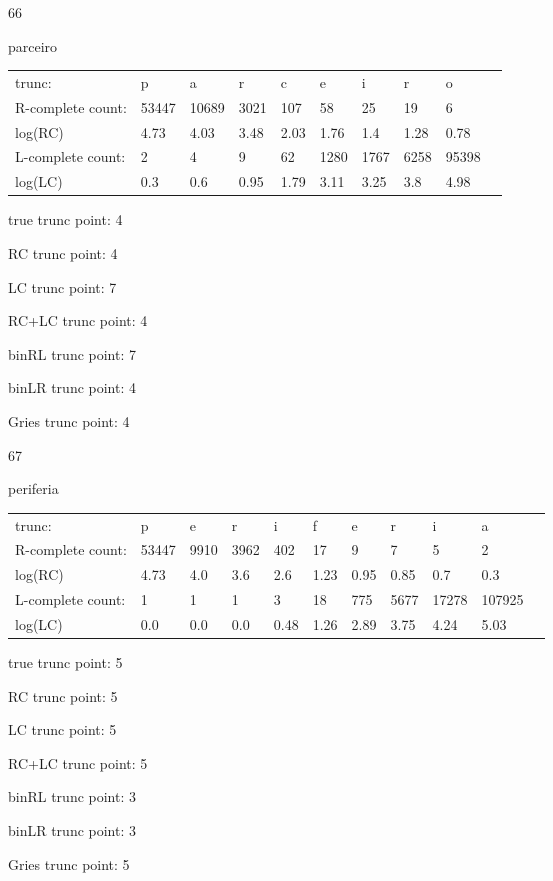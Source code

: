 \documentclass[10pt]{article}
\begin{document}
66

parceiro

\begin{tabular}{l|lllllllll}
trunc: & p & a & r & c & e & i & r & o & \\ 
R-complete count: & 53447 & 10689 & 3021 & 107 & 58 & 25 & 19 & 6 & \\ 
log(RC) & 4.73 & 4.03 & 3.48 & 2.03 & 1.76 & 1.4 & 1.28 & 0.78 & \\ 
L-complete count: & 2 & 4 & 9 & 62 & 1280 & 1767 & 6258 & 95398 & \\ 
log(LC) & 0.3 & 0.6 & 0.95 & 1.79 & 3.11 & 3.25 & 3.8 & 4.98 & \\ 
\end{tabular}

true trunc point: 4

RC trunc point: 4

LC trunc point: 7

RC+LC trunc point: 4

binRL trunc point: 7

binLR trunc point: 4

Gries trunc point: 4

\vspace{1em}

67

periferia

\begin{tabular}{l|llllllllll}
trunc: & p & e & r & i & f & e & r & i & a & \\ 
R-complete count: & 53447 & 9910 & 3962 & 402 & 17 & 9 & 7 & 5 & 2 & \\ 
log(RC) & 4.73 & 4.0 & 3.6 & 2.6 & 1.23 & 0.95 & 0.85 & 0.7 & 0.3 & \\ 
L-complete count: & 1 & 1 & 1 & 3 & 18 & 775 & 5677 & 17278 & 107925 & \\ 
log(LC) & 0.0 & 0.0 & 0.0 & 0.48 & 1.26 & 2.89 & 3.75 & 4.24 & 5.03 & \\ 
\end{tabular}

true trunc point: 5

RC trunc point: 5

LC trunc point: 5

RC+LC trunc point: 5

binRL trunc point: 3

binLR trunc point: 3

Gries trunc point: 5

\vspace{1em}
\end{document}
